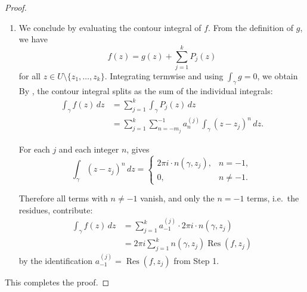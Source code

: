 \begin{proof}
\begin{enumerate}
        \item We conclude by evaluating the contour integral of $f$. From the definition of $g$, we have
        $$f(z) = g(z) + \sum_{j=1}^{k} P_j(z)$$
        for all $z \in U \setminus \{z_1, \ldots, z_k\}$. Integrating termwise and using $\int_\gamma g = 0$, we obtain
        By , the contour integral splits as the sum of the individual integrals:
        \begin{align*}
        \int_{\gamma} f(z) \, dz &= \sum_{j=1}^{k} \int_{\gamma} P_j(z) \, dz \\
        &= \sum_{j=1}^{k} \sum_{n=-m_j}^{-1} a_n^{(j)} \int_{\gamma} (z - z_j)^n \, dz.
        \end{align*}

        For each $j$ and each integer $n$,  gives
        $$\int_{\gamma} (z - z_j)^n \, dz =
        \begin{cases}
        2\pi i \cdot n(\gamma, z_j), & n = -1,\\
        0,                           & n \neq -1.
        \end{cases}$$

        Therefore all terms with $n \neq -1$ vanish, and only the $n = -1$ terms, i.e.\ the residues, contribute:
        \begin{align*}
        \int_{\gamma} f(z) \, dz &= \sum_{j=1}^{k} a_{-1}^{(j)} \cdot 2\pi i \cdot n(\gamma, z_j) \\
        &= 2\pi i \sum_{j=1}^{k} n(\gamma, z_j) \operatorname{Res}(f, z_j)
        \end{align*}
        by the identification $a_{-1}^{(j)} = \operatorname{Res}(f, z_j)$ from Step 1.
    \end{enumerate}

    This completes the proof.
\end{proof}